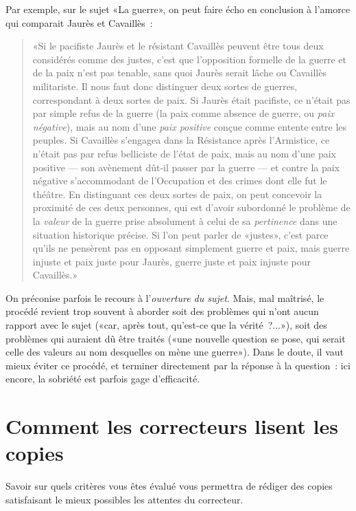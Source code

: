 \documentclass[a4paper,11pt]{article}
\begin{document}
Par exemple, sur le sujet «La guerre», on peut faire écho en conclusion
à l'amorce qui comparait Jaurès et Cavaillès~:

\begin{quote}
  «Si le pacifiste Jaurès et le résistant Cavaillès peuvent être tous
  deux considérés comme des justes, c'est que l'opposition formelle de
  la guerre et de la paix n'est pas tenable, sans quoi Jaurès serait
  lâche ou Cavaillès militariste. Il nous faut donc distinguer deux
  sortes de guerres, correspondant à deux sortes de paix. Si Jaurès
  était pacifiste, ce n'était pas par simple refus de la guerre (la paix
  comme absence de guerre, ou \emph{paix négative}), mais au nom d'une
  \emph{paix positive} conçue comme entente entre les peuples. Si
  Cavaillès s'engagea dans la Résistance après l'Armistice, ce n'était
  pas par refus belliciste de l'état de paix, mais au nom d'une paix
  positive --- son avènement dût-il passer par la guerre --- et contre
  la paix négative s'accommodant de l'Occupation et des crimes dont elle
  fut le théâtre. En distinguant ces deux sortes de paix, on peut
  concevoir la proximité de ces deux personnes, qui est d'avoir
  subordonné le problème de la \emph{valeur} de la guerre prise
  absolument à celui de sa \emph{pertinence} dans une situation
  historique précise. Si l'on peut parler de «justes», c'est parce
  qu'ils ne pensèrent pas en opposant simplement guerre et paix, mais
  guerre injuste et paix juste pour Jaurès, guerre juste et paix injuste
  pour Cavaillès.»
\end{quote}

\par

On préconise parfois le recours à l'\emph{ouverture du sujet}. Mais, mal
maîtrisé, le procédé revient trop souvent à aborder soit des problèmes
qui n'ont aucun rapport avec le sujet («car, après tout, qu'est-ce que
la vérité~?...»), soit des problèmes qui auraient dû être traités («une
nouvelle question se pose, qui serait celle des valeurs au nom
desquelles on mène une guerre»). Dans le doute, il vaut mieux éviter ce
procédé, et terminer directement par la réponse à la question~: ici
encore, la sobriété est parfois gage d'efficacité.


\section{Comment les correcteurs lisent les copies}

Savoir sur quels critères vous êtes évalué vous permettra de rédiger des
copies satisfaisant le mieux possibles les attentes du correcteur. 
\end{document}
